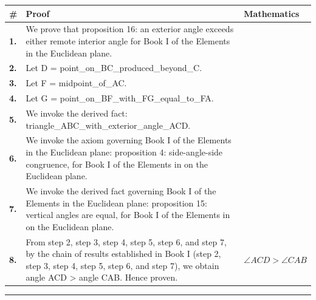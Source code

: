 \documentclass[11pt]{article}
\theoremstyle{definition}
\begin{document}
\begin{tabular}{@{} >{\raggedright\arraybackslash}p{} >{\raggedright\arraybackslash}p{} >{\raggedleft\arraybackslash}p{} @{}}
\textbf{\#} & \textbf{Proof} & \textbf{Mathematics} \\
\midrule
\textbf{1.} & We prove that proposition 16: an exterior angle exceeds either remote interior angle for Book I of the Elements in the Euclidean plane. & \\[0.45em]
\textbf{2.} & Let D = point\_on\_BC\_produced\_beyond\_C. & \\[0.45em]
\textbf{3.} & Let F = midpoint\_of\_AC. & \\[0.45em]
\textbf{4.} & Let G = point\_on\_BF\_with\_FG\_equal\_to\_FA. & \\[0.45em]
\textbf{5.} & We invoke the derived fact: triangle\_ABC\_with\_exterior\_angle\_ACD. & \\[0.45em]
\textbf{6.} & We invoke the axiom governing Book I of the Elements in the Euclidean plane: proposition 4: side-angle-side congruence, for Book I of the Elements in on the Euclidean plane. & \\[0.45em]
\textbf{7.} & We invoke the derived fact governing Book I of the Elements in the Euclidean plane: proposition 15: vertical angles are equal, for Book I of the Elements in on the Euclidean plane. & \\[0.45em]
\textbf{8.} & From step 2, step 3, step 4, step 5, step 6, and step 7, by the chain of results established in Book I (step 2, step 3, step 4, step 5, step 6, and step 7), we obtain angle ACD > angle CAB. Hence proven. & $\displaystyle \angle ACD > \angle CAB$ \\[0.45em]
\bottomrule
\end{tabular}
\label{thm:Geometry-Euclid Book I-proposition_16_an_exterior_angle_exceeds_either_remote_interior_angle}
\par\medskip\hrule
\end{document}
